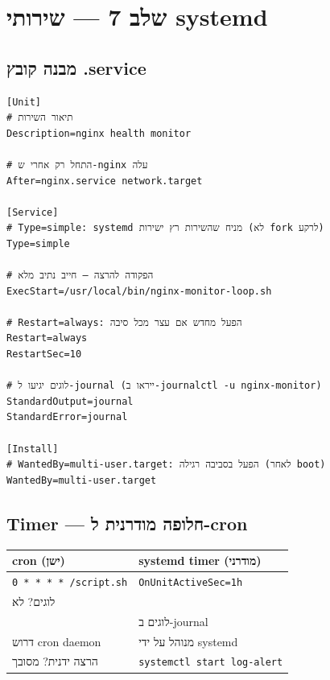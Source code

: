 \documentclass[12pt,a4paper]{article}
\begin{document}
\newpage
\section{שלב 7 — שירותי systemd}

\subsection{מבנה קובץ .service}

\begin{lstlisting}[caption={nginx-monitor.service — הסבר מלא}]
[Unit]
# תיאור השירות
Description=nginx health monitor

# התחל רק אחרי ש-nginx עלה
After=nginx.service network.target

[Service]
# Type=simple: systemd מניח שהשירות רץ ישירות (לא fork לרקע)
Type=simple

# הפקודה להרצה — חייב נתיב מלא
ExecStart=/usr/local/bin/nginx-monitor-loop.sh

# Restart=always: הפעל מחדש אם עצר מכל סיבה
Restart=always
RestartSec=10

# לוגים יגיעו ל-journal (ייראו ב-journalctl -u nginx-monitor)
StandardOutput=journal
StandardError=journal

[Install]
# WantedBy=multi-user.target: הפעל בסביבה רגילה (לאחר boot)
WantedBy=multi-user.target
\end{lstlisting}

\subsection{Timer — חלופה מודרנית ל-cron}

\begin{center}
\begin{tabular}{ll}
\toprule
\textbf{cron (ישן)} & \textbf{systemd timer (מודרני)} \\
\midrule
\texttt{0 * * * * /script.sh} & \texttt{OnUnitActiveSec=1h} \\
לוגים? לא \\
\quad & לוגים ב-journal \\
דרוש cron daemon & מנוהל על ידי systemd \\
הרצה ידנית? מסובך & \texttt{systemctl start log-alert} \\
\bottomrule
\end{tabular}
\end{center}
\end{document}
